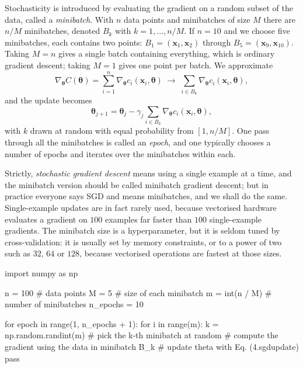 Stochasticity is introduced by evaluating the gradient on a random subset of
the data, called a \emph{minibatch}.  With $n$ data points and minibatches of
size $M$ there are $n/M$ minibatches, denoted $B_k$ with $k=1,\dots,n/M$.  If
$n=10$ and we choose five minibatches, each contains two points:
$B_1=(\bm{x}_1,\bm{x}_2)$ through $B_5=(\bm{x}_9,\bm{x}_{10})$.  Taking $M=n$
gives a single batch containing everything, which is ordinary gradient
descent; taking $M=1$ gives one point per batch.  We approximate
\begin{equation}
  \nabla_{\bm{\theta}}C(\bm{\theta})
   = \sum_{i=1}^{n}\nabla_{\bm{\theta}}c_i(\bm{x}_i,\bm{\theta})
   \;\longrightarrow\;
   \sum_{i\in B_k}\nabla_{\bm{\theta}}c_i(\bm{x}_i,\bm{\theta}),
  \label{eq:4-sgdgradient}
\end{equation}
and the update becomes
\begin{equation}
  \bm{\theta}_{j+1} = \bm{\theta}_j
    - \gamma_j\sum_{i\in B_k}\nabla_{\bm{\theta}}c_i(\bm{x}_i,\bm{\theta}),
  \label{eq:4-sgdupdate}
\end{equation}
with $k$ drawn at random with equal probability from $[1,n/M]$.  One pass
through all the minibatches is called an \emph{epoch}, and one typically
chooses a number of epochs and iterates over the minibatches within each.

Strictly, \emph{stochastic gradient descent} means using a single example at a
time, and the minibatch version should be called minibatch gradient descent;
but in practice everyone says SGD and means minibatches, and we shall do the
same.  Single-example updates are in fact rarely used, because vectorised
hardware evaluates a gradient on $100$ examples far faster than $100$
single-example gradients.  The minibatch size is a hyperparameter, but it is
seldom tuned by cross-validation: it is usually set by memory constraints, or
to a power of two such as $32$, $64$ or $128$, because vectorised operations
are fastest at those sizes.

\begin{Python}{}
import numpy as np

n = 100            # data points
M = 5              # size of each minibatch
m = int(n / M)     # number of minibatches
n_epochs = 10

for epoch in range(1, n_epochs + 1):
    for i in range(m):
        k = np.random.randint(m)     # pick the k-th minibatch at random
        # compute the gradient using the data in minibatch B_k
        # update theta with Eq. (4.sgdupdate)
        pass
\end{Python}

